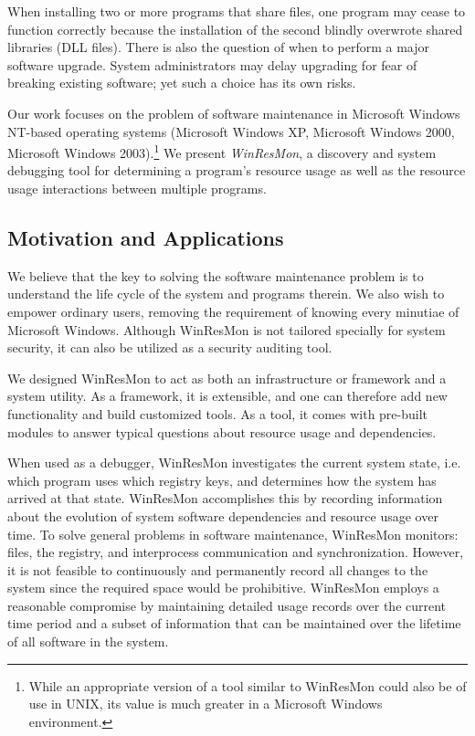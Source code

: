 When installing two or more programs that share files, one program may cease to
function correctly because the installation of the second blindly overwrote 
shared libraries (DLL files).  There is also the question of when to perform a
major software upgrade.  System administrators may delay upgrading
for fear of breaking existing software; yet such a choice has its own risks.

Our work focuses on the problem of software
maintenance in Microsoft Windows NT-based operating systems (Microsoft Windows
XP, Microsoft Windows 2000, Microsoft Windows 2003).\footnote{ While an
appropriate version of a tool similar to WinResMon could also be of use in UNIX,
its value is much greater in a Microsoft Windows environment.  } We present {\em WinResMon},
a discovery and system debugging tool for
determining a program's resource usage as well as the resource usage
interactions between multiple programs.


\subsection{Motivation and Applications}

We believe that the key to solving the software maintenance problem is to
understand the life cycle of the system and programs therein.  We also wish
to empower ordinary users, removing the requirement of knowing every minutiae
of Microsoft Windows.  Although WinResMon is not tailored specially for system
security, it can also be utilized as a security auditing tool.

We designed WinResMon to act as both an infrastructure or framework
and a system utility.  
As a framework, it is extensible, and one can therefore add
new functionality and build customized tools.  As a tool, it comes with
pre-built modules to answer typical questions about resource usage and
dependencies.

When used as a debugger, WinResMon investigates the current system state,
i.e. which program uses which registry keys, and determines how the system has
arrived at that state.  WinResMon accomplishes this by recording information
about the evolution of system software dependencies and resource usage over
time.  To solve general problems in software maintenance, WinResMon monitors:
files, the registry, and interprocess communication and synchronization.
However, it is not feasible to continuously and permanently record all changes
to the system since the required space would be prohibitive.  
WinResMon employs
a reasonable compromise by maintaining detailed usage records 
over the current time period and a
subset of information that can be maintained over the lifetime 
of all software in the system.

